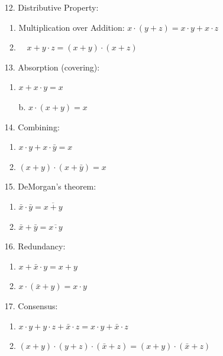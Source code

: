\documentclass[12pt,openany]{book}
\begin{document}
\begin{multicols}{2}
\begin{enumerate}
\begin{enumerate}
			      			      \end{enumerate}
			      			\item[12.] Distributive Property:
			      			      \begin{enumerate}
			      			      	\item Multiplication over Addition: \( x \cdot (y + z) = x \cdot y + x \cdot z \)
			      			      	\item $\quad x + y \cdot z = (x + y) \cdot (x + z)$
			      			      \end{enumerate}
			      			\item[13.] Absorption (covering):
			      			      \begin{enumerate}
			      			      	\item $x + x \cdot y = x$
			      			      	\item[b.] $x \cdot (x + y) = x$
			      			      \end{enumerate}
			      			\item[14.] Combining:
			      			      \begin{enumerate}
			      			      	\item $x \cdot y + x \cdot \bar{y} = x$
			      			      	\item $(x + y) \cdot (x + \bar{y}) = x$ 
			      			      \end{enumerate}
			      			      \vspace*{20px}
			      			\item[15.] DeMorgan's theorem:
			      			      \begin{enumerate}
			      			      	\item $\bar{x} \cdot \bar{y} = \overline{x + y}$
			      			      	\item $\bar{x} + \bar{y} = \overline{x \cdot y}$
			      			      \end{enumerate}
			      			\item[16.] Redundancy:
			      			      \begin{enumerate}
			      			      	\item $x + \bar{x} \cdot y = x + y$
			      			      	\item $x \cdot (\bar{x} + y) = x \cdot y$
			      			      \end{enumerate}
			      			\item[17.] Consensus:
			      			      \begin{enumerate}
			      			      	\item $x \cdot y + y \cdot z + \bar{x} \cdot z = x \cdot y + \bar{x} \cdot z$
			      			      	\item $(x + y) \cdot (y + z) \cdot (\bar{x} + z) = (x + y) \cdot (\bar{x} + z)$
			      			      \end{enumerate}
			      		\end{enumerate}
			      		        
			      	\end{multicols} %
			      	            
\end{document}
